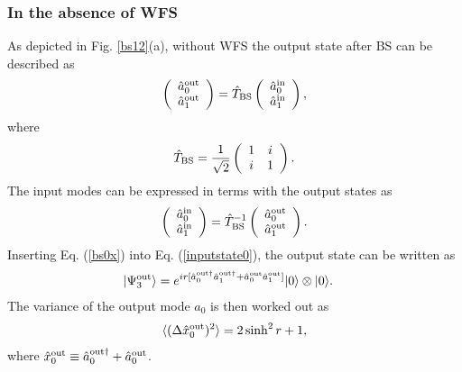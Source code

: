 \documentclass[9pt,twocolumn,twoside]{osajnl}
\begin{document}
\subsubsection{In the absence of WFS}
\label{bsabsence}
As depicted in Fig. \ref{bs12}(a), without WFS the output state after BS can be described as
\begin{align}
\left(
\begin{array}
[c]{c}%
\hat{a}_{0}^{\rm{out}} \\
\hat{a}_{1}^{\rm{out}}%
\end{array}
\right)
=
\hat{T}_{\rm{BS}}
\left(
\begin{array}
[c]{c}%
\hat{a}_{0}^{\rm{in}} \\
\hat{a}_{1}^{\rm{in}}%
\end{array}
\right)
,
\end{align}
where
\begin{align}
\hat{T}_{\rm{BS}}  =\frac{1}{\sqrt{2}}\left(
\begin{array}
[c]{cc}%
1 & i\\
i & 1%
\end{array}
\right)
.\label{bs}
\end{align}
The input modes can be expressed in terms with the output states as
\begin{align}
\left(
\begin{array}
[c]{c}%
\hat{a}_{0}^{\rm{in}} \\
\hat{a}_{1}^{\rm{in}}%
\end{array}
\right)
=
\hat{T}_{\rm{BS}}^{-1}
\left(
\begin{array}
[c]{c}%
\hat{a}_{0}^{\rm{out}} \\
\hat{a}_{1}^{\rm{out}}%
\end{array}
\right)
.\label{bs0x}
\end{align}
Inserting Eq. (\ref{bs0x}) into Eq. (\ref{inputstate0}), the output state can be written as
\begin{align}
|\Psi^{\rm{out}}_3\rangle &= e^{i r [\hat{a}_0^{\rm{out}\dagger} \hat{a}_1^{\rm{out}\dagger} +  \hat{a}_0^{\rm{out} } \hat{a}_1^{\rm{out} }]}|0\rangle \otimes |0\rangle.
\end{align}
The variance of the output mode $a_0$ is then worked out as
\begin{align}
\label{tmsq}
\langle (\Delta \hat{x}_{0}^{\rm{out}})^2 \rangle = 2 \sinh^2 r + 1,
\end{align} 
where $\hat{x}_{0}^{\rm{out}} \equiv \hat{a}_{0}^{\rm{out} \dagger} + \hat{a}_{0}^{\rm{out}}$.
\end{document}
